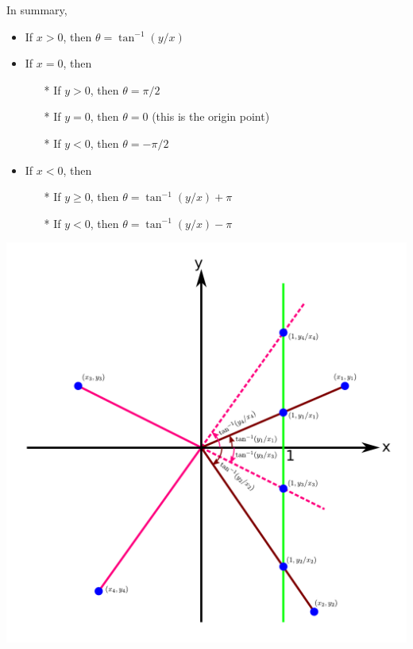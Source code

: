 \documentclass{article}
\begin{document}
In summary, 
\begin{itemize}
\item If \(x > 0\), then \(\theta = \tan^{-1}(y/x)\)
\item If \(x = 0\), then
	\begin{itemize}
	\item[*] If \(y > 0\), then \(\theta = \pi/2\)
	\item[*] If \(y = 0\), then \(\theta = 0\) (this is the origin point)
	\item[*] If \(y < 0\), then \(\theta = -\pi/2\)
	\end{itemize}
\item If \(x < 0\), then
	\begin{itemize}
	\item[*] If \(y \geq 0\), then \(\theta = \tan^{-1}(y/x) + \pi\)
	\item[*] If \(y < 0\), then \(\theta = \tan^{-1}(y/x) - \pi\)
	\end{itemize}
\end{itemize}


\includegraphics[scale = 0.9]{computing_theta}
\end{document}
